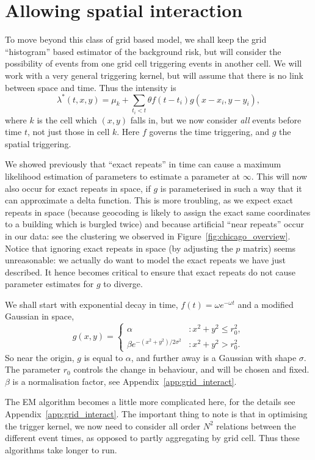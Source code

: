 \documentclass[twoside,a4paper]{article}
\theoremstyle{plain}
\theoremstyle{definition}
\begin{document}
\section{Allowing spatial interaction}\label{sec:grid_interact}

To move beyond this class of grid based model, we shall keep the grid ``histogram'' based
estimator of the background risk, but will consider the possibility of events from one grid
cell triggering events in another cell.  We will work with a very general triggering kernel,
but will assume that there is no link between space and time.  Thus the intensity is
\[ \lambda^*(t,x,y) = \mu_k + \sum_{t_i<t} \theta f(t-t_i) g(x-x_i, y-y_i), \]
where $k$ is the cell which $(x,y)$ falls in, but we now consider \emph{all} events before
time $t$, not just those in cell $k$.  Here $f$ governs the time triggering, and $g$ the
spatial triggering.

We showed previously that ``exact repeats'' in time can cause a maximum likelihood estimation of
parameters to estimate a parameter at $\infty$.  This will now also occur for exact repeats
in space, if $g$ is parameterised in such a way that it can approximate a delta function.
This is more troubling, as we expect exact repeats in space (because geocoding is likely
to assign the exact same coordinates to a building which is burgled twice) and because
artificial ``near repeats'' occur in our data: see the clustering we
observed in Figure~\ref{fig:chicago_overview}.  Notice that ignoring exact repeats in space
(by adjusting the $p$ matrix) seems unreasonable: we actually do want to model the exact repeats
we have just described.  It hence becomes critical to ensure that exact repeats do not
cause parameter estimates for $g$ to diverge.

We shall start with exponential decay in time, $f(t) = \omega e^{-\omega t}$ and a modified
Gaussian in space,
\[ g(x,y) = \begin{cases} \alpha &: x^2+y^2\leq r_0^2, \\
\beta e^{-(x^2+y^2)/2\sigma^2} &: x^2+y^2 > r_0^2. \end{cases} \]
So near the origin, $g$ is equal to $\alpha$, and further away is a Gaussian with shape
$\sigma$.  The parameter $r_0$ controls the change in behaviour, and will be chosen and fixed.
$\beta$ is a normalisation factor, see Appendix~\ref{app:grid_interact}.

The EM algorithm becomes a little more complicated here, for the details see
Appendix~\ref{app:grid_interact}.  The important thing to note is that in optimising the
trigger kernel, we now need to consider all order $N^2$ relations between the different
event times, as opposed to partly aggregating by grid cell.  Thus these algorithms take
longer to run.
\end{document}
